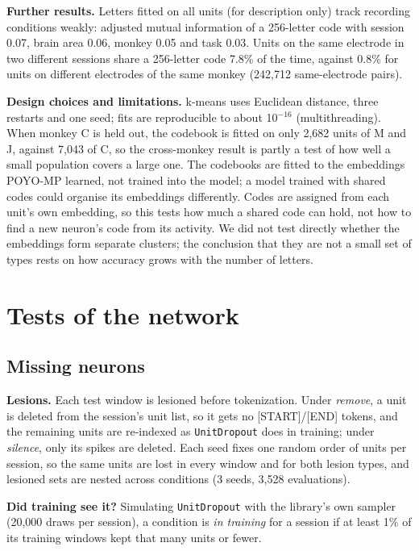 \documentclass[11pt]{article}
\begin{document}
\textbf{Further results.} Letters fitted on all units (for description only) track recording conditions weakly: adjusted mutual information of a 256-letter code with session 0.07, brain area 0.06, monkey 0.05 and task 0.03. Units on the same electrode in two different sessions share a 256-letter code 7.8\% of the time, against 0.8\% for units on different electrodes of the same monkey (242,712 same-electrode pairs).

\textbf{Design choices and limitations.} k-means uses Euclidean distance, three restarts and one seed; fits are reproducible to about 10$^{-16}$ (multithreading). When monkey C is held out, the codebook is fitted on only 2,682 units of M and J, against 7,043 of C, so the cross-monkey result is partly a test of how well a small population covers a large one. The codebooks are fitted to the embeddings POYO-MP learned, not trained into the model; a model trained with shared codes could organise its embeddings differently. Codes are assigned from each unit's own embedding, so this tests how much a shared code can hold, not how to find a new neuron's code from its activity. We did not test directly whether the embeddings form separate clusters; the conclusion that they are not a small set of types rests on how accuracy grows with the number of letters.

\setcounter{table}{0}
\renewcommand{\thetable}{C\arabic{table}}
\section{Tests of the network}

\subsection{Missing neurons}

\textbf{Lesions.} Each test window is lesioned before tokenization. Under \emph{remove}, a unit is deleted from the session's unit list, so it gets no [START]/[END] tokens, and the remaining units are re-indexed as \texttt{UnitDropout} does in training; under \emph{silence}, only its spikes are deleted. Each seed fixes one random order of units per session, so the same units are lost in every window and for both lesion types, and lesioned sets are nested across conditions (3 seeds, 3,528 evaluations).

\textbf{Did training see it?} Simulating \texttt{UnitDropout} with the library's own sampler (20,000 draws per session), a condition is \emph{in training} for a session if at least 1\% of its training windows kept that many units or fewer.
\end{document}
